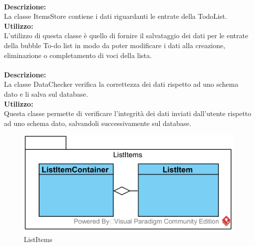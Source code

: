 \label{todo-itemsStore}\mbox{}\\
\textbf{Descrizione:}\\
La classe ItemsStore contiene i dati riguardanti le entrate della TodoList.\\
\textbf{Utilizzo:}\\
L'utilizzo di questa classe è quello di fornire il salvataggio dei dati per le entrate della bubble To-do list in modo da poter modificare i dati alla creazione, eliminazione o completamento di voci della lista.\\

\label{todo-gateway}\mbox{}\\
\textbf{Descrizione:}\\
La classe DataChecker verifica la correttezza dei dati rispetto ad uno schema dato e li salva sul database.\\
\textbf{Utilizzo:}\\
Questa classe permette di verificare l'integrità dei dati inviati dall'utente rispetto ad uno schema dato, salvandoli successivamente sul database.

\begin{figure}[H]
	\centering
	\includegraphics[width=14cm]{../../documenti/SpecificaTecnica/diagrammi_img/classi_e_package/todo_listitems.png}
	\caption{List\-Items}
\end{figure}

